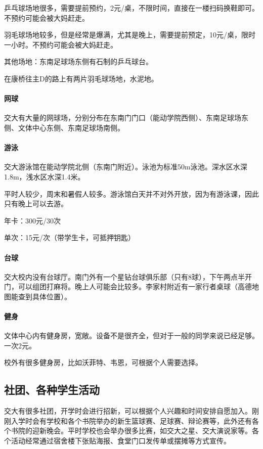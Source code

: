 \documentclass[
decoration,  %
]{qyxf-book}
\begin{document}
乒乓球场地很多，需要提前预约，2元/桌，不限时间，直接在一楼扫码换鞋即可。不预约可能会被大妈赶走。

羽毛球场地较多，但是经常是爆满，尤其是晚上，需要提前预定，10元/桌，限时一小时。不预约可能会被大妈赶走。

其他场地：东南足球场东侧有石制的乒乓球台。

在康桥往主D的路上有两片羽毛球场地，水泥地。

\paragraph{网球}
交大有大量的网球场，分别分布在东南门门口（能动学院西侧）、东南足球场东侧、文体中心东侧、东南足球场南侧。

\paragraph{游泳}
交大游泳馆在能动学院北侧（东南门附近）。泳池为标准50m泳池。深水区水深1.8m，浅水区水深1.4米。

平时人较少，周末和暑假人较多。游泳馆白天并不对外开放，因为有游泳课，因此只有晚上可以去游。

年卡：300元/30次

单次：15元/次（带学生卡，可抵押钥匙）


\paragraph{台球}

交大校内没有台球厅。南门外有一个星钻台球俱乐部（只有8球），下午两点半开门，可以组团打麻将。晚上人可能会比较多。李家村附近有一家行者桌球（高德地图能查到具体位置）。

\paragraph{健身}

文体中心内有健身房，宽敞。设备不是很齐全，但对于一般的同学来说已经足够。一次2元。

校外有很多健身房，比如沃菲特、韦恩，可根据个人需要选择。


\subsection{社团、各种学生活动}

交大有很多社团，开学时会进行招新，可以根据个人兴趣和时间安排自愿加入。刚刚入学时会有学校和各个书院举办的新生篮球赛、足球赛、辩论赛等，此外还有各个书院的迎新晚会。平时学校也会举办很多比赛，如交大之星、交大演说家等。各个活动经常通过宿舍楼下张贴海报、食堂门口发传单或摆摊等方式宣传。
\end{document}
